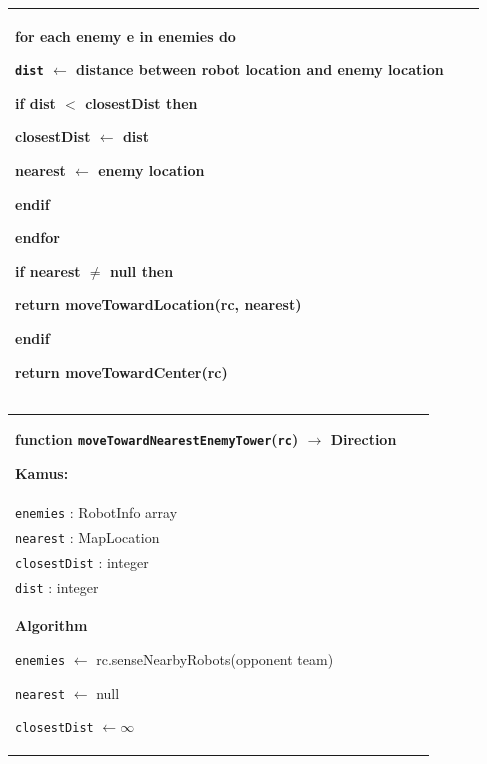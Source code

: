 \documentclass{article}
\newenvironment{pseudobox}
{
\centering
\begin{longtable}{|p{0.94\linewidth}|}
\hline
}
{
\\ \hline
\end{longtable}
\vspace{0.05cm}
}
\begin{document}
\begin{enumerate}[label=\alph*.]
\begin{pseudobox}
\hspace*{1.5em}for each enemy e in enemies do

\hspace*{3em}\texttt{dist} $\leftarrow$ distance between robot location and enemy location

\hspace*{3em}if dist $<$ closestDist then

\hspace*{4.5em}closestDist $\leftarrow$ dist

\hspace*{4.5em}nearest $\leftarrow$ enemy location

\hspace*{3em}endif

\hspace*{1.5em}endfor

\hspace*{1.5em}if nearest $\neq$ null then

\hspace*{3em}return moveTowardLocation(rc, nearest)

\hspace*{1.5em}endif

\hspace*{1.5em}return moveTowardCenter(rc)
\end{pseudobox}

\begin{pseudobox}
\textbf{function \texttt{moveTowardNearestEnemyTower}(\texttt{rc}) $\rightarrow$ Direction}

\textbf{Kamus:} \\
\hspace*{1.5em}\texttt{enemies} : RobotInfo array \\
\hspace*{1.5em}\texttt{nearest} : MapLocation \\
\hspace*{1.5em}\texttt{closestDist} : integer \\
\hspace*{1.5em}\texttt{dist} : integer \\

\textbf{Algorithm}

\hspace*{1.5em}\texttt{enemies} $\leftarrow$ rc.senseNearbyRobots(opponent team)

\hspace*{1.5em}\texttt{nearest} $\leftarrow$ null

\hspace*{1.5em}\texttt{closestDist} $\leftarrow \infty$


\end{pseudobox}
\end{enumerate}
\end{document}
